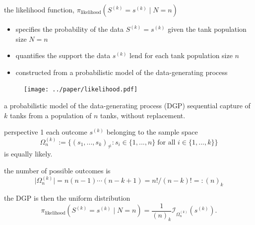 \documentclass[10pt]{beamer}
\begin{document}
\begin{frame}[t]{the likelihood function, $\pi_{\text{likelihood}}(S^{(k)}=s^{(k)} \mid N=n)$}
\begin{itemize}
	\item specifies the probability of the data $S^{(k)}=s^{(k)}$ given the tank population size $N=n$
	\item quantifies the support the data $s^{(k)}$ lend for each tank population size $n$
	\item constructed from a probabilistic model of the data-generating process
\end{itemize}

\begin{figure}[h!]
	\centering
	\texttt{[image: ../paper/likelihood.pdf]}
\end{figure}

\end{frame}
\begin{frame}[t]{a probabilistic model of the data-generating process (DGP)}
sequential capture of $k$ tanks from a population of $n$ tanks, without replacement.

\begin{exampleblock}{perspective 1}
each outcome $s^{(k)}$ belonging to the sample space
\begin{equation*}
	\Omega_n^{(k)} := \{ (s_1, ..., s_k)_{\neq}  :  s_i \in \{1, ..., n\} \; \text{for all } i \in \{ 1,..., k \} \}
\end{equation*} 
is equally likely.

\pause the number of possible outcomes is
\begin{equation*}
	\lvert \Omega_n^{(k)} \rvert= n(n-1)\cdots (n-k+1) = n! / (n-k)! =:(n)_k
\end{equation*}

\pause the DGP is then the uniform distribution
\begin{equation*}
	\pi_{\text{likelihood}}(S^{(k)}=s^{(k)} \mid N=n)=
	\dfrac{1}{(n)_k} \mathcal{I}_{\Omega_n^{(k)}}\left(s^{(k)}\right).
\end{equation*}
\end{exampleblock}

\end{frame}
\end{document}
